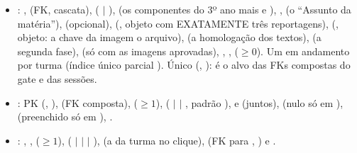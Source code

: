 \begin{itemize}
  \item {}: ,  (FK, cascata),
     ( $|$ ),  (os componentes do
    3º ano mais  e ), ,
     (o \enquote{Assunto da matéria}),  (opcional),
     (, objeto com EXATAMENTE três reportagens),
     (, objeto: a chave da imagem \seta{} o arquivo),
     (a homologação dos textos), 
    (a segunda fase),  (só com as imagens aprovadas), ,
    ,  ($\geq 0$). Um em andamento por turma
    (índice único parcial ).
    Único (, ): é o alvo das FKs compostas do gate e
    das sessões.
  \item {}: PK (, ),
     (FK composta),  ($\geq 1$), 
    ( $|$  $|$ , padrão ),
     e  (juntos),  (nulo
    só em ),  (preenchido só em
    ), .
  \item {}: , ,
     ($\geq 1$),  ( $|$  $|$
     $|$ ),  (a da turma no clique),
     (FK para , ) e .
\end{itemize}

\subsection{}

